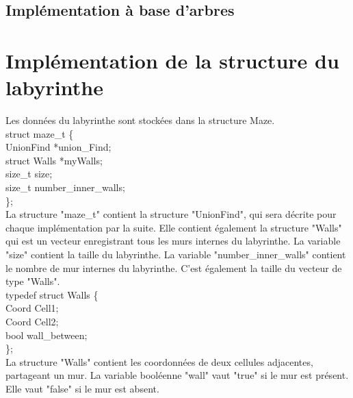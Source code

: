 \documentclass[11pt]{article}
\begin{document}
\subsection{Implémentation à base d'arbres}


\section{Implémentation de la structure du labyrinthe}
Les données du labyrinthe sont stockées dans la structure Maze. \\
struct maze\_t \{ \\
\quad    UnionFind *union\_Find; \\
\quad     struct Walls *myWalls; \\
\quad     size\_t size; \\
\quad     size\_t number\_inner\_walls; \\
\};\\

La structure "maze\_t" contient la structure "UnionFind", qui sera décrite pour chaque implémentation par la suite. Elle contient également la structure "Walls" qui est un vecteur enregistrant tous les murs internes du labyrinthe. La variable "size" contient la taille du labyrinthe. La variable "number\_inner\_walls" contient le nombre de mur internes du labyrinthe. C'est également la taille du vecteur de type "Walls". \\
\linebreak
typedef struct Walls \{ \\
    Coord Cell1; \\
    Coord Cell2; \\
    bool wall\_between; \\
\};\\

La structure "Walls" contient les coordonnées de deux cellules adjacentes, partageant un mur. La variable booléenne "wall" vaut "true" si le mur est présent. Elle vaut "false" si le mur est absent.\\
\end{document}
